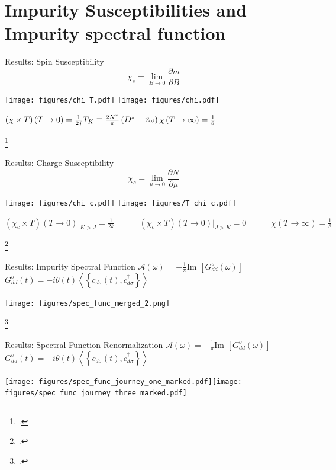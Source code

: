\documentclass[aspectratio=169]{beamer}
\newcommand{\cen}[1]{\begin{center}{#1}\end{center}}
\begin{document}
\section{Impurity Susceptibilities and Impurity spectral function}
\begin{frame}[noframenumbering]{Results: Spin Susceptibility}
	\vspace*{-20pt}
	\[\chi_s = \lim_{B \to 0} \frac{\partial{m}}{\partial{B}}\]
\cen{
	\hspace*{-20pt}
	\texttt{[image: figures/chi\_T.pdf]}
	\hspace*{25pt}
	\texttt{[image: figures/chi.pdf]}
}
\hspace*{20pt}\large{\(
\left(\chi\times T\right)\left( T \to 0 \right) = \frac{1}{2j} \hspace*{\fill} T_K \equiv \frac{2N^*}{\pi}\left(D^* - 2\omega\right)\hspace*{\fill} \chi \left( T \to \infty \right) = \frac{1}{8}\)}

\footcite{wilson, hrk-nrg}
\end{frame}

\begin{frame}[noframenumbering]{Results: Charge Susceptibility}
	\vspace*{-15pt}
	\[\chi_c = \lim_{\mu \to 0} \frac{\partial{N}}{\partial{\mu}}\]
\cen{
	\hspace*{-20pt}
	\texttt{[image: figures/chi\_c.pdf]}
	\hspace*{25pt}
	\texttt{[image: figures/T\_chi\_c.pdf]}
}
\large{\(
\left(\chi_c\times T\right)\left(T \to 0\right)\big\vert_{K>J} = \frac{1}{2k} \quad\quad\quad \left(\chi_c\times T\right)\left(T \to 0\right)\big\vert_{J>K} = 0 \quad\quad\quad \chi \left( T \to \infty \right) = \frac{1}{8}\)}

\footcite{taraphder,charge-kondo-Zitko}
\end{frame}

\begin{frame}[noframenumbering]{Results: Impurity Spectral Function}
	\(\mathcal{A(\omega)} = -\frac{1}{\pi}\text{Im }\left[G_{d d}^\sigma\left( \omega \right) \right]\) \hspace*{\fill} \(G_{d d}^\sigma\left(t\right) = -i\theta(t)\left<\left\{ c_{d\sigma}(t), c^\dagger_{d\sigma} \right\}\right>\)
\cen{
	\texttt{[image: figures/spec\_func\_merged\_2.png]}
}
\footcite{hewson,bulla_costi_nrg}
\end{frame}

\begin{frame}[noframenumbering]{Results: Spectral Function Renormalization}
	\(\mathcal{A(\omega)} = -\frac{1}{\pi}\text{Im }\left[G_{d d}^\sigma\left( \omega \right) \right]\) \hspace*{\fill} \(G_{d d}^\sigma\left(t\right) = -i\theta(t)\left<\left\{ c_{d\sigma}(t), c^\dagger_{d\sigma} \right\}\right>\)
\cen{
	\texttt{[image: figures/spec\_func\_journey\_one\_marked.pdf]}\hspace*{\fill}\texttt{[image: figures/spec\_func\_journey\_three\_marked.pdf]}
}
\end{frame}
\end{document}
